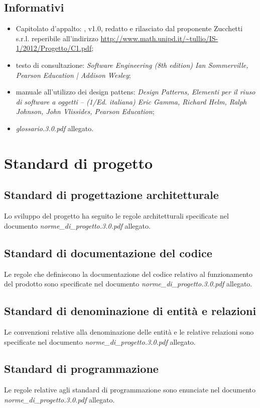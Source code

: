 \subsection{Informativi}
\begin{itemize}
\item[] Capitolato d'appalto: \caName{}, v1.0, redatto e rilasciato dal proponente Zucchetti s.r.l. reperibile all'indirizzo \url{http://www.math.unipd.it/~tullio/IS-1/2012/Progetto/C1.pdf};
\item[] testo di consultazione: \textit{Software Engineering (8th edition) Ian Sommerville, Pearson Education | Addison Wesley};
\item[] manuale all'utilizzo dei design pattens: \textit{Design Patterns, Elementi per il riuso di software a oggetti -- (1/Ed. italiana) Eric Gamma, Richard Helm, Ralph Johnson, John Vlissides, Pearson Education};
\item[] \textit{glossario.3.0.pdf} allegato.
\end{itemize}
\clearpage

\section{Standard di progetto}

\subsection{Standard di progettazione architetturale}
Lo sviluppo del progetto ha seguito le regole architetturali specificate nel documento  \textit{norme\_di\_progetto.3.0.pdf} allegato.

\subsection{Standard di documentazione del codice}
Le regole che definiscono la documentazione del codice relativo al funzionamento del prodotto sono specificate nel documento \textit{norme\_di\_progetto.3.0.pdf} allegato.

\subsection{Standard di denominazione di entità e relazioni}
Le convenzioni relative alla denominazione delle entità e le relative relazioni sono specificate nel documento \textit{norme\_di\_progetto.3.0.pdf} allegato.

\subsection{Standard di programmazione}
Le regole relative agli standard di programmazione sono enunciate nel documento \textit{norme\_di\_progetto.3.0.pdf} allegato.

